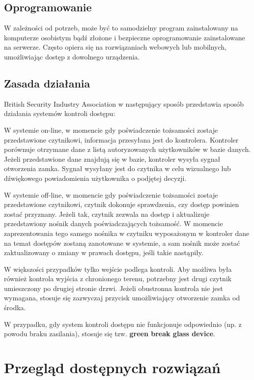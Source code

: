 \subsection{Oprogramowanie}
W zależności od potrzeb, może być to samodzielny program zainstalowany na komputerze osobistym bądź złożone i bezpieczne oprogramowanie zainstalowane na serwerze. Często opiera się na rozwiązaniach webowych lub mobilnych, umożliwiając dostęp z dowolnego urządzenia.~\cite{bsia2016}

\subsection{Zasada działania}
British Security Industry Association w następujący sposób przedstawia sposób działania systemów kontroli dostępu:

W systemie on-line, w momencie gdy poświadczenie tożsamości zostaje przedstawione czytnikowi, informacja przesyłana jest do kontrolera. Kontroler porównuje otrzymane dane z listą autoryzowanych użytkowników w bazie danych. Jeżeli przedstawione dane znajdują się w bazie, kontroler wysyła sygnał otworzenia zamka. Sygnał wysyłany jest do czytnika w celu wizualnego lub dźwiękowego powiadomienia użytkownika o podjętej decyzji.~\cite{bsia2016}

W systemie off-line, w momencie gdy poświadczenie tożsamości zostaje przedstawione czytnikowi, czytnik dokonuje sprawdzenia, czy dostęp powinien zostać przyznany. Jeżeli tak, czytnik zezwala na dostęp i aktualizuje przedstawiony nośnik danych poświadczających tożsamość. W momencie zaprezentowania tego samego nośnika w czytniku wyposażonym w kontroler dane na temat dostępów zostaną zanotowane w systemie, a sam nośnik może zostać zaktualizowany o zmiany w prawach dostępu, jeśli takie nastąpiły.~\cite{bsia2016}

W większości przypadków tylko wejście podlega kontroli. Aby możliwa była również kontrola wyjścia z chronionego terenu, potrzebny jest drugi czytnik umieszczony po drugiej stronie drzwi. Jeżeli obustronna kontrola nie jest wymagana, stosuje się zazwyczaj przycisk umożliwiający otworzenie zamka od środka.~\cite{bsia2016}

W przypadku, gdy system kontroli dostępu nie funkcjonuje odpowiednio (np. z powodu braku zasilania), stosuje się tzw. \textbf{green break glass device}.~\cite{bsia2016}

\section{Przegląd dostępnych rozwiązań}


